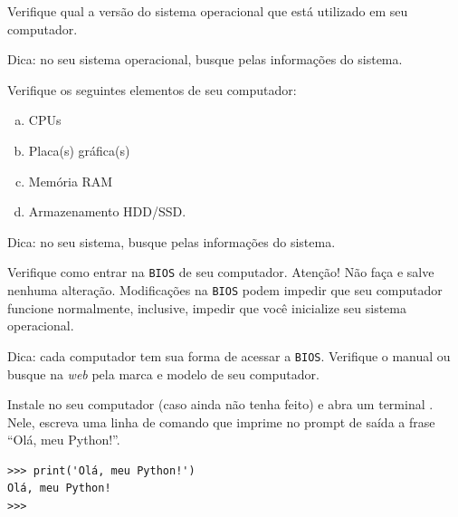 
\begin{exer}
  Verifique qual a versão do sistema operacional que está utilizado em seu computador.
\end{exer}
\begin{resp}
  Dica: no seu sistema operacional, busque pelas informações do sistema.
\end{resp}

\begin{exer}
  Verifique os seguintes elementos de seu computador:
  \begin{enumerate}[a)]
  \item CPUs
  \item Placa(s) gráfica(s)
  \item Memória RAM
  \item Armazenamento HDD/SSD.
  \end{enumerate}
\end{exer}
\begin{resp}
  Dica: no seu sistema, busque pelas informações do sistema.
\end{resp}

\begin{exer}
  Verifique como entrar na \texttt{BIOS} de seu computador. Atenção! Não faça e salve nenhuma alteração. Modificações na \texttt{BIOS} podem impedir que seu computador funcione normalmente, inclusive, impedir que você inicialize seu sistema operacional.
\end{exer}
\begin{resp}
  Dica: cada computador tem sua forma de acessar a \texttt{BIOS}. Verifique o manual ou busque na \textit{web} pela marca e modelo de seu computador.
\end{resp}

\begin{exer}
  Instale {\python} no seu computador (caso ainda não tenha feito) e abra um terminal {\python}. Nele, escreva uma linha de comando que imprime no prompt de saída a frase ``Olá, meu Python!''.
\end{exer}
\begin{resp}

\begin{lstlisting}
>>> print('Olá, meu Python!')
Olá, meu Python!
>>> 
\end{lstlisting}

\end{resp}

